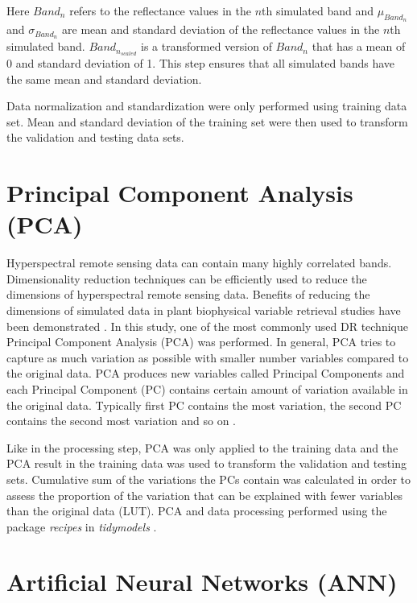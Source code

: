 \documentclass[a4paper, twoside]{templates/ociamthesis}
\begin{document}
Here \(Band_{n}\) refers to the reflectance values in the \(n\)th simulated band and \(\mu_{Band_n}\) and \(\sigma_{Band_n}\) are mean and standard deviation of the reflectance values in the \(n\)th simulated band. \(Band_{n_{scaled}}\) is a transformed version of \(Band_{n}\) that has a mean of 0 and standard deviation of 1. This step ensures that all simulated bands have the same mean and standard deviation.

Data normalization and standardization were only performed using training data set. Mean and standard deviation of the training set were then used to transform the validation and testing data sets.

\hypertarget{principal-component-analysis-pca}{%
\section{Principal Component Analysis (PCA)}\label{principal-component-analysis-pca}}

Hyperspectral remote sensing data can contain many highly correlated bands. Dimensionality reduction techniques can be efficiently used to reduce the dimensions of hyperspectral remote sensing data. Benefits of reducing the dimensions of simulated data in plant biophysical variable retrieval studies have been demonstrated \citep{danner2021efficient, rivera2017hyperspectral}. In this study, one of the most commonly used DR technique Principal Component Analysis (PCA) was performed. In general, PCA tries to capture as much variation as possible with smaller number variables compared to the original data. PCA produces new variables called Principal Components and each Principal Component (PC) contains certain amount of variation available in the original data. Typically first PC contains the most variation, the second PC contains the second most variation and so on \citep{bro2014principal}.

Like in the processing step, PCA was only applied to the training data and the PCA result in the training data was used to transform the validation and testing sets. Cumulative sum of the variations the PCs contain was calculated in order to assess the proportion of the variation that can be explained with fewer variables than the original data (LUT). PCA and data processing performed using the package \emph{recipes} \citep{recipes} in \emph{tidymodels} \citep{tidymodels}.

\hypertarget{artificial-neural-networks-ann}{%
\section{Artificial Neural Networks (ANN)}\label{artificial-neural-networks-ann}}
\end{document}
